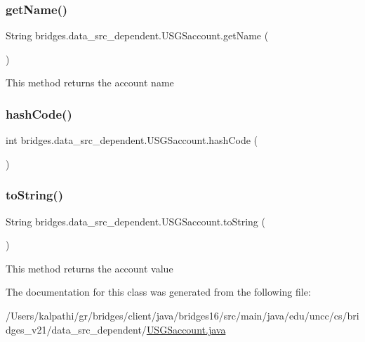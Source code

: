 \subsubsection{\texorpdfstring{get\+Name()}{getName()}}
{\footnotesize\ttfamily String bridges.\+data\+\_\+src\+\_\+dependent.\+U\+S\+G\+Saccount.\+get\+Name (\begin{DoxyParamCaption}{ }\end{DoxyParamCaption})}

This method returns the account name \hypertarget{classbridges_1_1data__src__dependent_1_1_u_s_g_saccount_afe2cc53d7993aaf4424f42fb535c7ed1}{}\label{classbridges_1_1data__src__dependent_1_1_u_s_g_saccount_afe2cc53d7993aaf4424f42fb535c7ed1} 
\subsubsection{\texorpdfstring{hash\+Code()}{hashCode()}}
{\footnotesize\ttfamily int bridges.\+data\+\_\+src\+\_\+dependent.\+U\+S\+G\+Saccount.\+hash\+Code (\begin{DoxyParamCaption}{ }\end{DoxyParamCaption})}

\hypertarget{classbridges_1_1data__src__dependent_1_1_u_s_g_saccount_a832c5a4953a40fd3fa89243fcdabc435}{}\label{classbridges_1_1data__src__dependent_1_1_u_s_g_saccount_a832c5a4953a40fd3fa89243fcdabc435} 
\subsubsection{\texorpdfstring{to\+String()}{toString()}}
{\footnotesize\ttfamily String bridges.\+data\+\_\+src\+\_\+dependent.\+U\+S\+G\+Saccount.\+to\+String (\begin{DoxyParamCaption}{ }\end{DoxyParamCaption})}

This method returns the account value 

The documentation for this class was generated from the following file\+:\begin{DoxyCompactItemize}
\item 
/\+Users/kalpathi/gr/bridges/client/java/bridges16/src/main/java/edu/uncc/cs/bridges\+\_\+v21/data\+\_\+src\+\_\+dependent/\hyperlink{_u_s_g_saccount_8java}{U\+S\+G\+Saccount.\+java}\end{DoxyCompactItemize}
